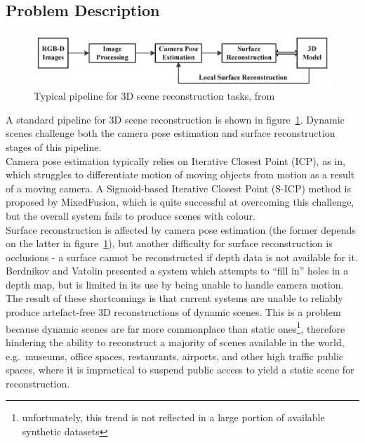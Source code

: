 \subsection{Problem Description}\label{subsec:problem-description}
\begin{figure}[h]
	\centering
	\includegraphics[width=\columnwidth]{../images/pipeline}
	\caption{Typical pipeline for 3D scene reconstruction tasks, from\cite{Li:2022aa}}\label{fig:pipeline}
\end{figure}
A standard pipeline for 3D scene reconstruction is shown in figure~\ref{fig:pipeline}.
Dynamic scenes challenge both the camera pose estimation and surface reconstruction stages of this pipeline\cite{Zhang:2018aa,berdnikov2011real}.
\\[1ex]
Camera pose estimation typically relies on Iterative Closest Point (ICP), as in\cite{kinectfusionms, elasticfusion},
which struggles to differentiate motion of moving objects from motion as a result of a moving camera.
A Sigmoid-based Iterative Closest Point (S-ICP) method is proposed by MixedFusion\cite{Zhang:2018aa}, which is quite
successful at overcoming this challenge, but the overall system fails to produce scenes with colour.
\\[1ex]
Surface reconstruction is affected by camera pose estimation (the former depends on the latter in figure~\ref{fig:pipeline}),
but another difficulty for surface reconstruction is occlusions - a surface cannot be reconstructed if depth data is not
available for it.
Berdnikov and Vatolin presented a system\cite{berdnikov2011real} which attempts to ``fill in'' holes in a depth map, but
is limited in its use by being unable to handle camera motion.
\\[1ex]
The result of these shortcomings is that current systems are unable to reliably produce artefact-free 3D reconstructions
of dynamic scenes.
This is a problem because dynamic scenes are far more commonplace than static ones\footnote{unfortunately, this trend is
not reflected in a large portion of available synthetic datasets}, therefore hindering the ability to reconstruct a majority
of scenes available in the world, e.g.\ museums, office spaces, restaurants, airports, and other high traffic public
spaces, where it is impractical to suspend public access to yield a static scene for reconstruction.

